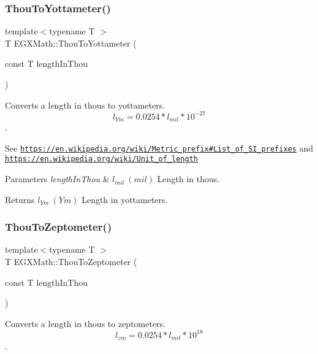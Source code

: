 \subsubsection{\texorpdfstring{Thou\+To\+Yottameter()}{ThouToYottameter()}}
{\footnotesize\ttfamily template$<$typename T $>$ \\
T E\+G\+X\+Math\+::\+Thou\+To\+Yottameter (\begin{DoxyParamCaption}\item[{const T}]{length\+In\+Thou }\end{DoxyParamCaption})}



Converts a length in thous to yottameters. \[ l_{Ym}=0.0254 * l_{mil} * 10^{-27} \]. 

See \href{https://en.wikipedia.org/wiki/Metric_prefix#List_of_SI_prefixes}{\tt https\+://en.\+wikipedia.\+org/wiki/\+Metric\+\_\+prefix\#\+List\+\_\+of\+\_\+\+S\+I\+\_\+prefixes} and \href{https://en.wikipedia.org/wiki/Unit_of_length}{\tt https\+://en.\+wikipedia.\+org/wiki/\+Unit\+\_\+of\+\_\+length} 
\begin{DoxyParams}{Parameters}
{\em length\+In\+Thou} & $ l_{mil}\ (mil)$ Length in thous. \\
\hline
\end{DoxyParams}
\begin{DoxyReturn}{Returns}
$ l_{Ym}\ (Ym)$ Length in yottameters. 
\end{DoxyReturn}
\mbox{\label{group___e_g_x_math-_conversions-_length_conversions-_imperial-_thou-_s_i_ga496bafe1152fe3ede3021fd49289b6e5}} 
\subsubsection{\texorpdfstring{Thou\+To\+Zeptometer()}{ThouToZeptometer()}}
{\footnotesize\ttfamily template$<$typename T $>$ \\
T E\+G\+X\+Math\+::\+Thou\+To\+Zeptometer (\begin{DoxyParamCaption}\item[{const T}]{length\+In\+Thou }\end{DoxyParamCaption})}



Converts a length in thous to zeptometers. \[ l_{zm}=0.0254 * l_{mil} * 10^{18} \]. 

